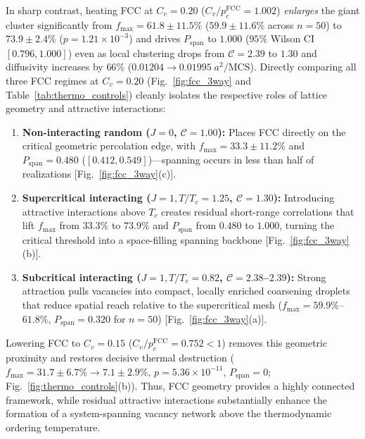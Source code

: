 \documentclass[aps,pre,reprint,superscriptaddress,amsmath,amssymb,floatfix]{revtex4-2}
\begin{document}
In sharp contrast, heating FCC at $C_v = 0.20$ ($C_v/p_c^{\mathrm{FCC}} = 1.002$) \emph{enlarges} the giant cluster significantly from $f_{\max} = 61.8 \pm 11.5\%$ ($59.9 \pm 11.6\%$ across $n = 50$) to $73.9 \pm 2.4\%$ ($p = 1.21 \times 10^{-3}$) and drives $P_{\mathrm{span}}$ to $1.000$ ($95\%$ Wilson CI $[0.796, 1.000]$) even as local clustering drops from $\mathcal{C} = 2.39$ to $1.30$ and diffusivity increases by $66\%$ ($0.01204 \to 0.01995\;a^2/\mathrm{MCS}$). Directly comparing all three FCC regimes at $C_v = 0.20$ (Fig.~\ref{fig:fcc_3way} and Table~\ref{tab:thermo_controls}) cleanly isolates the respective roles of lattice geometry and attractive interactions:
\begin{enumerate}
  \item \textbf{Non-interacting random ($J = 0$, $\mathcal{C} = 1.00$):} Places FCC directly on the critical geometric percolation edge, with $f_{\max} = 33.3 \pm 11.2\%$ and $P_{\mathrm{span}} = 0.480$ ($[0.412, 0.549]$)---spanning occurs in less than half of realizations [Fig.~\ref{fig:fcc_3way}(c)].
  \item \textbf{Supercritical interacting ($J = 1, T/T_c = 1.25$, $\mathcal{C} = 1.30$):} Introducing attractive interactions above $T_c$ creates residual short-range correlations that lift $f_{\max}$ from $33.3\%$ to $73.9\%$ and $P_{\mathrm{span}}$ from $0.480$ to $1.000$, turning the critical threshold into a space-filling spanning backbone [Fig.~\ref{fig:fcc_3way}(b)].
  \item \textbf{Subcritical interacting ($J = 1, T/T_c = 0.82$, $\mathcal{C} = 2.38$--$2.39$):} Strong attraction pulls vacancies into compact, locally enriched coarsening droplets that reduce spatial reach relative to the supercritical mesh ($f_{\max} = 59.9\%$--$61.8\%$, $P_{\mathrm{span}} = 0.320$ for $n = 50$) [Fig.~\ref{fig:fcc_3way}(a)].
\end{enumerate}
Lowering FCC to $C_v = 0.15$ ($C_v/p_c^{\mathrm{FCC}} = 0.752 < 1$) removes this geometric proximity and restores decisive thermal destruction ($f_{\max} = 31.7 \pm 6.7\% \to 7.1 \pm 2.9\%$, $p = 5.36 \times 10^{-11}$, $P_{\mathrm{span}} = 0$; Fig.~\ref{fig:thermo_controls}(b)). Thus, FCC geometry provides a highly connected framework, while residual attractive interactions substantially enhance the formation of a system-spanning vacancy network above the thermodynamic ordering temperature.
\end{document}
